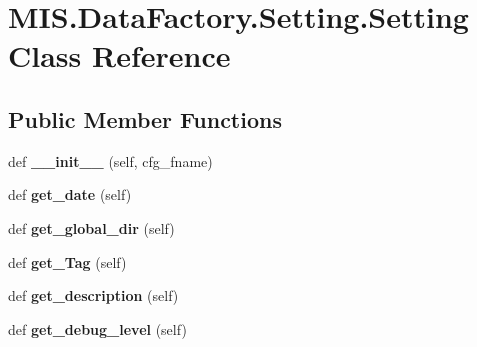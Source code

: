 \hypertarget{classMIS_1_1DataFactory_1_1Setting_1_1Setting}{}\section{M\+I\+S.\+Data\+Factory.\+Setting.\+Setting Class Reference}
\label{classMIS_1_1DataFactory_1_1Setting_1_1Setting}
\subsection*{Public Member Functions}
\begin{DoxyCompactItemize}
\item 
\mbox{\label{classMIS_1_1DataFactory_1_1Setting_1_1Setting_ab9d6d472a16597a6d07c8c28e4cc51ab}} 
def {\bfseries \+\_\+\+\_\+init\+\_\+\+\_\+} (self, cfg\+\_\+fname)
\item 
\mbox{\label{classMIS_1_1DataFactory_1_1Setting_1_1Setting_a64737c33e0e898a967efb02c493d5a33}} 
def {\bfseries get\+\_\+date} (self)
\item 
\mbox{\label{classMIS_1_1DataFactory_1_1Setting_1_1Setting_af196121e3bd8cfedd3d653ad16487bd7}} 
def {\bfseries get\+\_\+global\+\_\+dir} (self)
\item 
\mbox{\label{classMIS_1_1DataFactory_1_1Setting_1_1Setting_a6682cbea85195a1a7eafe23bce7a6b2c}} 
def {\bfseries get\+\_\+\+Tag} (self)
\item 
\mbox{\label{classMIS_1_1DataFactory_1_1Setting_1_1Setting_aba3cfc8c7eeaecc575f95a5bfe4042c1}} 
def {\bfseries get\+\_\+description} (self)
\item 
\mbox{\label{classMIS_1_1DataFactory_1_1Setting_1_1Setting_ac8f51e04267136d8eb46434da456b13a}} 
def {\bfseries get\+\_\+debug\+\_\+level} (self)
\item 
\mbox{\label{classMIS_1_1DataFactory_1_1Setting_1_1Setting_ae25a3d678c48b819ce6cf745d6f017e6}} 

\end{DoxyCompactItemize}
